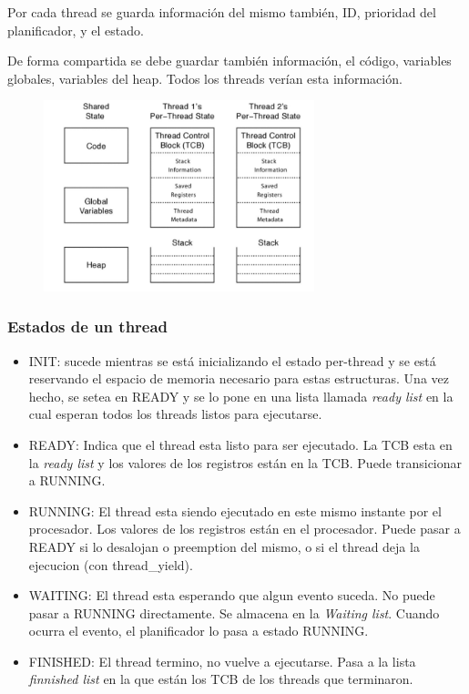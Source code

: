 \documentclass[titlepage,a4paper]{article}
\begin{document}
Por cada thread se guarda información del mismo también, ID, prioridad del planificador, y el estado.

De forma compartida se debe guardar también información, el código, variables globales, variables del heap. Todos los threads verían esta información.

\begin{figure}[!htb]
    \centering
    \includegraphics[width=0.7\textwidth]{ImagenesApunte/threads_data.jpg}
\end{figure}

\subsubsection*{Estados de un thread}
\begin{itemize}
    \item INIT: sucede mientras se está inicializando el estado per-thread y se está reservando el espacio de memoria necesario para estas estructuras. Una vez hecho, se setea en READY y se lo pone en una lista llamada \emph{ready list} en la cual esperan todos los threads listos para ejecutarse.
    \item READY: Indica que el thread esta listo para ser ejecutado. La TCB esta en la \emph{ready list} y los valores de los registros están en la TCB. Puede transicionar a RUNNING.
    \item RUNNING: El thread esta siendo ejecutado en este mismo instante por el procesador. Los valores de los registros están en el procesador. Puede pasar a READY si lo desalojan o preemption del mismo, o si el thread deja la ejecucion (con thread\_yield).
    \item WAITING: El thread esta esperando que algun evento suceda. No puede pasar a RUNNING directamente. Se almacena en la \emph{Waiting list}. Cuando ocurra el evento, el planificador lo pasa a estado RUNNING.
    \item FINISHED: El thread termino, no vuelve a ejecutarse. Pasa a la lista \emph{finnished list} en la que están los TCB de los threads que terminaron.
\end{itemize}
\end{document}
